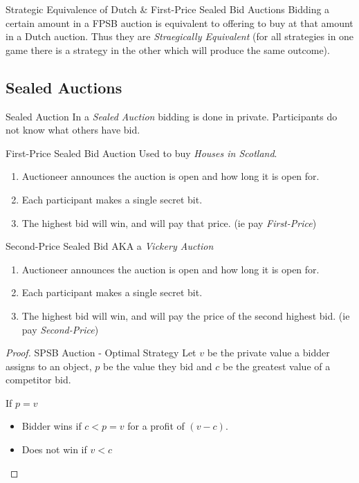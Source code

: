 \documentclass[11pt,a4paper]{article}
\begin{document}
\begin{remark}{Strategic Equivalence of Dutch \& First-Price Sealed Bid Auctions}
  Bidding a certain amount in a FPSB auction is equivalent to offering to buy at that amount in a Dutch auction. Thus they are \textit{Straegically Equivalent} (for all strategies in one game there is a strategy in the other which will produce the same outcome).
\end{remark}

\subsection{Sealed Auctions}

\begin{definition}{Sealed Auction}
  In a \textit{Sealed Auction} bidding is done in private. Participants do not know what others have bid.
\end{definition}

\begin{definition}{First-Price Sealed Bid Auction}
  Used to buy \textit{Houses in Scotland}.
  \begin{enumerate}
    \item Auctioneer announces the auction is open and how long it is open for.
    \item Each participant makes a single secret bit.
    \item The highest bid will win, and will pay that price. (ie pay \textit{First-Price})
  \end{enumerate}
\end{definition}

\begin{definition}{Second-Price Sealed Bid}
  AKA a \textit{Vickery Auction}
  \begin{enumerate}
    \item Auctioneer announces the auction is open and how long it is open for.
    \item Each participant makes a single secret bit.
    \item The highest bid will win, and will pay the price of the second highest bid. (ie pay \textit{Second-Price})
  \end{enumerate}
\end{definition}

\begin{proof}{SPSB Auction - Optimal Strategy}
  Let $v$ be the private value a bidder assigns to an object, $p$ be the value they bid and $c$ be the greatest value of a competitor bid.
  \par If $p=v$
  \begin{itemize}
    \item Bidder wins if $c<p=v$ for a profit of $(v-c)$.
    \item Does not win if $v<c$
  \end{itemize}
\end{proof}
\end{document}
